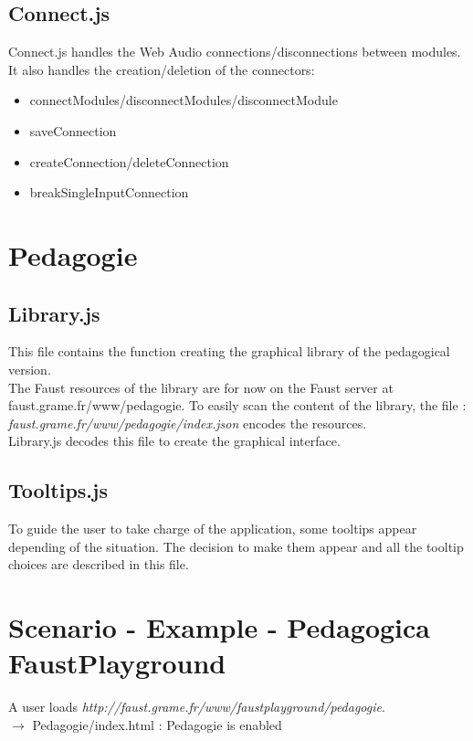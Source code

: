 \documentclass[a4paper]{article}
\begin{document}
\subsection{Connect.js}

Connect.js handles the Web Audio connections/disconnections between modules. It also handles the creation/deletion of the connectors:
\begin{itemize}
\item connectModules/disconnectModules/disconnectModule
\item saveConnection
\item createConnection/deleteConnection
\item breakSingleInputConnection
\end{itemize}

\section{Pedagogie}
\subsection{Library.js}

This file contains the function creating the graphical library of the pedagogical version. \\

The Faust resources of the library are for now on the Faust server at faust.grame.fr/www/pedagogie.
To easily scan the content of the library, the file : {\it faust.grame.fr/www/pedagogie/index.json} encodes the resources. \\
Library.js decodes this file to create the graphical interface.

\subsection{Tooltips.js}

To guide the user to take charge of the application, some tooltips appear depending of the situation.
The decision to make them appear and all the tooltip choices are described in this file.

\section{Scenario - Example - Pedagogica FaustPlayground}

A user loads {\it http://faust.grame.fr/www/faustplayground/pedagogie}. \\
$ \rightarrow$ Pedagogie/index.html : Pedagogie is enabled \\
\end{document}
